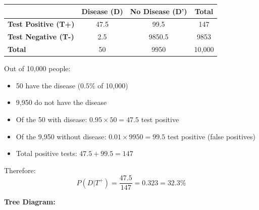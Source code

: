 \documentclass[11pt,a4paper]{article}
\begin{document}
\begin{answer}
{\small
\begin{center}
\begin{tabular}{|l|c|c|c|}
\hline
& \textbf{Disease (D)} & \textbf{No Disease (D')} & \textbf{Total} \\
\hline
\textbf{Test Positive (T+)} & 47.5 & 99.5 & 147 \\
\hline
\textbf{Test Negative (T-)} & 2.5 & 9850.5 & 9853 \\
\hline
\textbf{Total} & 50 & 9950 & 10,000 \\
\hline
\end{tabular}
\end{center}
}

Out of 10,000 people:
\begin{itemize}
    \item 50 have the disease ($0.5\%$ of 10,000)
    \item 9,950 do not have the disease
    \item Of the 50 with disease: $0.95 \times 50 = 47.5$ test positive
    \item Of the 9,950 without disease: $0.01 \times 9950 = 99.5$ test positive (false positives)
    \item Total positive tests: $47.5 + 99.5 = 147$
\end{itemize}

Therefore:
\[
P(D|T^+) = \frac{47.5}{147} = 0.323 = 32.3\%
\]

\vspace{0.3cm}
\textbf{Tree Diagram:}

\begin{center}
\end{center}
\end{answer}
\end{document}
